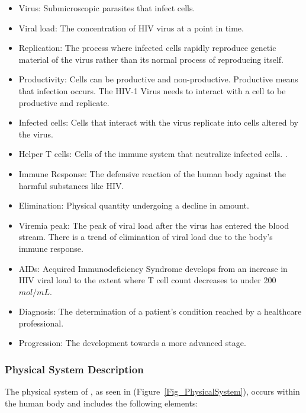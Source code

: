 \documentclass[12pt]{article}
\begin{document}
\begin{itemize}

\item Virus: Submicroscopic parasites that infect cells. 
\item Viral load: The concentration of HIV virus at a point in time.
\item Replication: The process where infected cells rapidly reproduce genetic 
material of the virus rather than its normal process of reproducing itself. 
\citep{BURRELL201739}
\item Productivity: Cells can be productive and non-productive. Productive means 
that infection occurs. The HIV-1 Virus needs to interact with a cell to be 
productive and replicate. \citep{BURRELL201739}
\item Infected cells: Cells that interact with the virus replicate into cells 
altered by the virus.
\item Helper T cells: Cells of the immune system that neutralize infected cells. 
\citep{william_2018}.
\item Immune Response: The defensive reaction of the human body against the 
harmful substances like HIV.
\item Elimination: Physical quantity undergoing a decline in amount.
\item Viremia peak: The peak of viral load after the virus has entered the blood 
stream. There is a trend of elimination of viral load due to the body's immune 
response. \citep{little1999}
\item AIDs: Acquired Immunodeficiency Syndrome develops from an increase in HIV 
viral load to the extent where T cell count decreases to under 200 
$mol/mL$.\citep{hiv.gov}
\item Diagnosis: The determination of a patient's condition reached by a 
healthcare professional.
\item Progression: The development towards a more advanced 
stage.


\end{itemize}

\subsubsection{Physical System Description} \label{sec_phySystDescrip}

The physical system of \progname{}, as seen in 
(Figure~\ref{Fig_PhysicalSystem}), occurs within the human body and includes the 
following elements:
\end{document}
